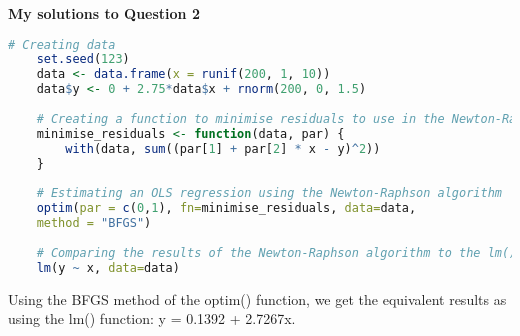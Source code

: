 \documentclass[12pt,letterpaper]{article}
\begin{document}
\textbf{My solutions to Question 2}
\vspace{.25cm}
\begin{lstlisting}[language=R]
	# Creating data
	set.seed(123)
	data <- data.frame(x = runif(200, 1, 10))
	data$y <- 0 + 2.75*data$x + rnorm(200, 0, 1.5)
	
	# Creating a function to minimise residuals to use in the Newton-Raphson algorithm
	minimise_residuals <- function(data, par) {
		with(data, sum((par[1] + par[2] * x - y)^2))
	}
	
	# Estimating an OLS regression using the Newton-Raphson algorithm
	optim(par = c(0,1), fn=minimise_residuals, data=data,
	method = "BFGS")
	
	# Comparing the results of the Newton-Raphson algorithm to the lm() function
	lm(y ~ x, data=data)\end{lstlisting}
\vspace{.25in}
Using the BFGS method of the optim() function, we get the equivalent results as using the lm() function: y = 0.1392 + 2.7267x.
\end{document}
